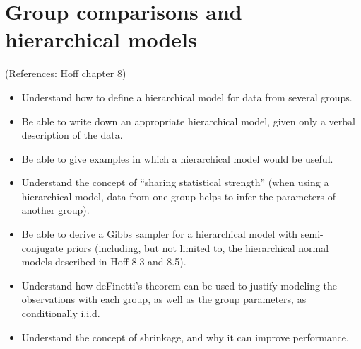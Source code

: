 \documentclass[12pt]{article}
\begin{document}
\section{Group comparisons and hierarchical models}
(References: Hoff chapter 8)
\begin{itemize}
\setlength\itemsep{0em}
\item Understand how to define a hierarchical model for data from several groups.
\item Be able to write down an appropriate hierarchical model, given only a verbal description of the data.
\item Be able to give examples in which a hierarchical model would be useful.
\item Understand the concept of ``sharing statistical strength'' (when using a hierarchical model, data from one group helps to infer the parameters of another group).
\item Be able to derive a Gibbs sampler for a hierarchical model with semi-conjugate priors
    (including, but not limited to, the hierarchical normal models described in Hoff 8.3 and 8.5).
\item Understand how deFinetti's theorem can be used to justify modeling the observations with each group, as well as the 
    group parameters, as conditionally i.i.d.
\item Understand the concept of shrinkage, and why it can improve performance.
\end{itemize}
\end{document}
